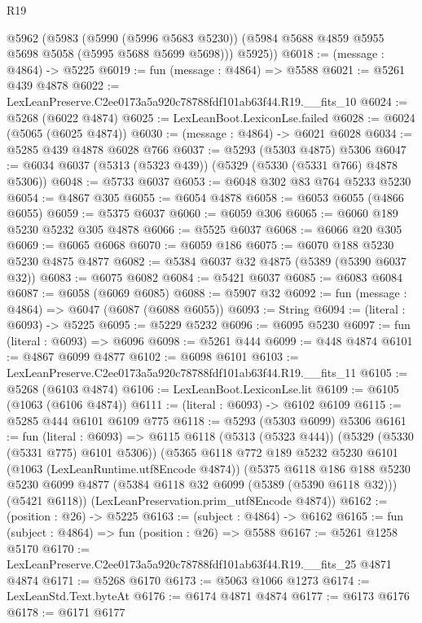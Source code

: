 \begin{lexlean}{R19}
\begin{coremodule}
      @5962
        (@5983
          (@5990 (@5996 @5683 @5230))
          (@5984 @5688 @4859 @5955 @5698 @5058 (@5995 @5688 @5699 @5698)))
        @5925))
@6018 := (message : @4864) -> @5225
@6019 := fun (message : @4864) => @5588
@6021 := @5261 @439 @4878
@6022 := LexLeanPreserve.C2ee0173a5a920c78788fdf101ab63f44.R19.__fits_10
@6024 := @5268 (@6022 @4874)
@6025 := LexLeanBoot.LexiconLse.failed
@6028 := @6024 (@5065 (@6025 @4874))
@6030 := (message : @4864) -> @6021 @6028
@6034 := @5285 @439 @4878 @6028 @766
@6037 := @5293 (@5303 @4875) @5306
@6047 := @6034 @6037 (@5313 (@5323 @439)) (@5329 (@5330 (@5331 @766) @4878 @5306))
@6048 := @5733 @6037
@6053 := @6048 @302 @83 @764 @5233 @5230
@6054 := @4867 @305
@6055 := @6054 @4878
@6058 := @6053 @6055 (@4866 @6055)
@6059 := @5375 @6037
@6060 := @6059 @306
@6065 := @6060 @189 @5230 @5232 @305 @4878
@6066 := @5525 @6037
@6068 := @6066 @20 @305
@6069 := @6065 @6068
@6070 := @6059 @186
@6075 := @6070 @188 @5230 @5230 @4875 @4877
@6082 := @5384 @6037 @32 @4875 (@5389 (@5390 @6037 @32))
@6083 := @6075 @6082
@6084 := @5421 @6037
@6085 := @6083 @6084
@6087 := @6058 (@6069 @6085)
@6088 := @5907 @32
@6092 := fun (message : @4864) => @6047 (@6087 (@6088 @6055))
@6093 := String
@6094 := (literal : @6093) -> @5225
@6095 := @5229 @5232
@6096 := @6095 @5230
@6097 := fun (literal : @6093) => @6096
@6098 := @5261 @444
@6099 := @448 @4874
@6101 := @4867 @6099 @4877
@6102 := @6098 @6101
@6103 := LexLeanPreserve.C2ee0173a5a920c78788fdf101ab63f44.R19.__fits_11
@6105 := @5268 (@6103 @4874)
@6106 := LexLeanBoot.LexiconLse.lit
@6109 := @6105 (@1063 (@6106 @4874))
@6111 := (literal : @6093) -> @6102 @6109
@6115 := @5285 @444 @6101 @6109 @775
@6118 := @5293 (@5303 @6099) @5306
@6161 := fun (literal : @6093) =>
  @6115
    @6118
    (@5313 (@5323 @444))
    (@5329 (@5330 (@5331 @775) @6101 @5306))
    (@5365
      @6118
      @772
      @189
      @5232
      @5230
      @6101
      (@1063 (LexLeanRuntime.utf8Encode @4874))
      (@5375
        @6118
        @186
        @188
        @5230
        @5230
        @6099
        @4877
        (@5384 @6118 @32 @6099 (@5389 (@5390 @6118 @32)))
        (@5421 @6118))
      (LexLeanPreservation.prim_utf8Encode @4874))
@6162 := (position : @26) -> @5225
@6163 := (subject : @4864) -> @6162
@6165 := fun (subject : @4864) => fun (position : @26) => @5588
@6167 := @5261 @1258 @5170
@6170 := LexLeanPreserve.C2ee0173a5a920c78788fdf101ab63f44.R19.__fits_25 @4871 @4874
@6171 := @5268 @6170
@6173 := @5063 @1066 @1273
@6174 := LexLeanStd.Text.byteAt
@6176 := @6174 @4871 @4874
@6177 := @6173 @6176
@6178 := @6171 @6177

\end{coremodule}
\end{lexlean}

